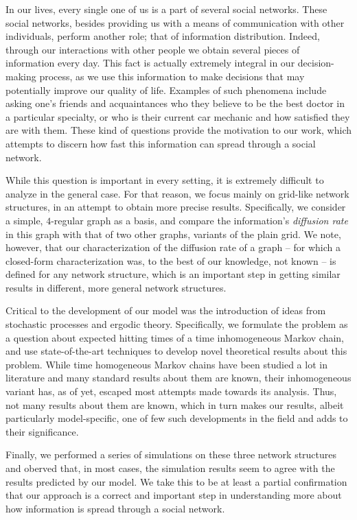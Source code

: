 \documentclass[format=acmsmall, review=false]{acmart}
\begin{document}
\par In our lives, every single one of us is a part of several social networks. These social networks, besides
providing us with a means of communication with other individuals, perform another role; that of information
distribution. Indeed, through our interactions with other people we obtain several pieces of information every
day. This fact is actually extremely integral in our decision-making process, as we use this information to
make decisions that may potentially improve our quality of life. Examples of such phenomena include asking one's
friends and acquaintances who they believe to be the best doctor in a particular specialty, or who is their
current car mechanic and how satisfied they are with them. These kind of questions provide the motivation to
our work, which attempts to discern how fast this information can spread through a social network.

\par While this question is important in every setting, it is extremely difficult to analyze in the general case.
For that reason, we focus mainly on grid-like network structures, in an attempt to obtain more precise results.
Specifically, we consider a simple, $4$-regular graph as a basis, and compare the information's
\textit{diffusion rate} in this graph with that of two other graphs, variants of the plain grid. We note, however,
that our characterization of the diffusion rate of a graph -- for which a closed-form characterization was, to the
best of our knowledge, not known -- is defined for any network structure, which is an important step in getting
similar results in different, more general network structures.

\par Critical to the development of our model was the introduction of ideas from stochastic processes and ergodic
theory. Specifically, we formulate the problem as a question about expected hitting times of a time inhomogeneous
Markov chain, and use state-of-the-art techniques to develop novel theoretical results about this problem. While
time homogeneous Markov chains have been studied a lot in literature and many standard results about them are known,
their inhomogeneous variant has, as of yet, escaped most attempts made towards its analysis. Thus, not many results
about them are known, which in turn makes our results, albeit particularly model-specific, one of few such
developments in the field and adds to their significance.

\par Finally, we performed a series of simulations on these three network structures and oberved that, in most cases,
the simulation results seem to agree with the results predicted by our model. We take this to be at least a partial
confirmation that our approach is a correct and important step in understanding more about how information is
spread through a social network.
\end{document}
